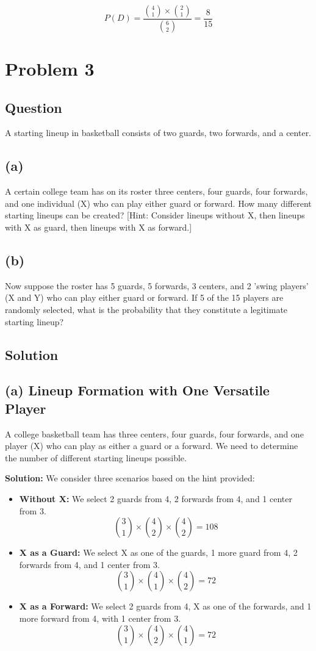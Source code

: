 \documentclass{article}
\begin{document}
\[
P(D) = \frac{\binom{4}{1} \times \binom{2}{1}}{\binom{6}{2}} = \frac{8}{15}
\]

\section*{Problem 3}
\subsection*{Question}
A starting lineup in basketball consists of two guards, two forwards, and a center.

\subsection*{(a)}
A certain college team has on its roster three centers, four guards, four forwards, and one individual (X) who can play either guard or forward. How many different starting lineups can be created? [Hint: Consider lineups without X, then lineups with X as guard, then lineups with X as forward.]

\subsection*{(b)}
Now suppose the roster has 5 guards, 5 forwards, 3 centers, and 2 'swing players' (X and Y) who can play either guard or forward. If 5 of the 15 players are randomly selected, what is the probability that they constitute a legitimate starting lineup?

\subsection*{Solution}

\subsection*{(a) Lineup Formation with One Versatile Player}
A college basketball team has three centers, four guards, four forwards, and one player (X) who can play as either a guard or a forward. We need to determine the number of different starting lineups possible.

\textbf{Solution:}
We consider three scenarios based on the hint provided:
\begin{itemize}
    \item \textbf{Without X:} We select 2 guards from 4, 2 forwards from 4, and 1 center from 3.
    \[
    \binom{3}{1} \times \binom{4}{2} \times \binom{4}{2} = 108
    \]
    \item \textbf{X as a Guard:} We select X as one of the guards, 1 more guard from 4, 2 forwards from 4, and 1 center from 3.
    \[
    \binom{3}{1} \times \binom{4}{1} \times \binom{4}{2} = 72
    \]
    \item \textbf{X as a Forward:} We select 2 guards from 4, X as one of the forwards, and 1 more forward from 4, with 1 center from 3.
    \[
    \binom{3}{1} \times \binom{4}{2} \times \binom{4}{1} = 72
    \]
\end{itemize}
\end{document}

